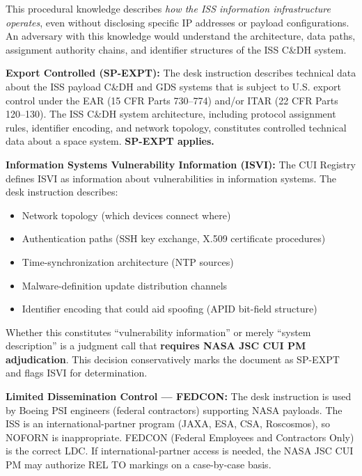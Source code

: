 {\begin{enumerate}
This procedural knowledge describes \textit{how the ISS information infrastructure operates}, even without disclosing specific IP addresses or payload configurations. An adversary with this knowledge would understand the architecture, data paths, assignment authority chains, and identifier structures of the ISS C\&DH system.


\textbf{Export Controlled (SP-EXPT):} The desk instruction describes technical data about the ISS payload C\&DH and GDS systems that is subject to U.S. export control under the EAR (15 CFR Parts 730--774) and/or ITAR (22 CFR Parts 120--130). The ISS C\&DH system architecture, including protocol assignment rules, identifier encoding, and network topology, constitutes controlled technical data about a space system. \textbf{SP-EXPT applies.}

\textbf{Information Systems Vulnerability Information (ISVI):} The CUI Registry defines ISVI as information about vulnerabilities in information systems. The desk instruction describes:
\begin{itemize}
    \item Network topology (which devices connect where)
    \item Authentication paths (SSH key exchange, X.509 certificate procedures)
    \item Time-synchronization architecture (NTP sources)
    \item Malware-definition update distribution channels
    \item Identifier encoding that could aid spoofing (APID bit-field structure)
\end{itemize}

Whether this constitutes ``vulnerability information'' or merely ``system description'' is a judgment call that \textbf{requires NASA JSC CUI PM adjudication}. This decision conservatively marks the document as SP-EXPT and flags ISVI for determination.

\textbf{Limited Dissemination Control --- FEDCON:} The desk instruction is used by Boeing PSI engineers (federal contractors) supporting NASA payloads. The ISS is an international-partner program (JAXA, ESA, CSA, Roscosmos), so NOFORN is inappropriate. FEDCON (Federal Employees and Contractors Only) is the correct LDC. If international-partner access is needed, the NASA JSC CUI PM may authorize REL TO markings on a case-by-case basis.



\end{enumerate}}
